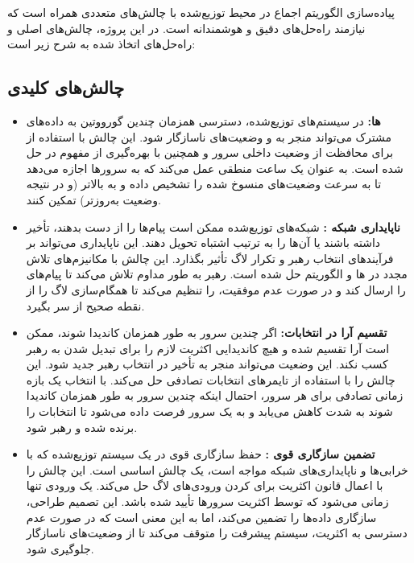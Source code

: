 \documentclass[12pt,a4paper]{article}
\begin{document}
پیاده‌سازی الگوریتم اجماع  در محیط توزیع‌شده با چالش‌های متعددی همراه است که نیازمند راه‌حل‌های دقیق و هوشمندانه است. در این پروژه، چالش‌های اصلی و راه‌حل‌های اتخاذ شده به شرح زیر است:

\subsection{چالش‌های کلیدی}

\begin{itemize}
    \item \textbf{ها:} در سیستم‌های توزیع‌شده، دسترسی همزمان چندین گورووتین به داده‌های مشترک می‌تواند منجر به  و وضعیت‌های ناسازگار شود. این چالش با استفاده از  برای محافظت از وضعیت داخلی سرور  و همچنین با بهره‌گیری از مفهوم  در  حل شده است.  به عنوان یک ساعت منطقی عمل می‌کند که به سرورها اجازه می‌دهد تا به سرعت وضعیت‌های منسوخ شده را تشخیص داده و به  بالاتر (و در نتیجه وضعیت به‌روزتر) تمکین کنند.
    \item \textbf{ناپایداری شبکه :} شبکه‌های توزیع‌شده ممکن است پیام‌ها را از دست بدهند، تأخیر داشته باشند یا آن‌ها را به ترتیب اشتباه تحویل دهند. این ناپایداری می‌تواند بر فرآیندهای انتخاب رهبر و تکرار لاگ تأثیر بگذارد. این چالش با مکانیزم‌های تلاش مجدد  در ها و الگوریتم   حل شده است. رهبر به طور مداوم تلاش می‌کند تا پیام‌های  را ارسال کند و در صورت عدم موفقیت،  را تنظیم می‌کند تا همگام‌سازی لاگ را از نقطه صحیح از سر بگیرد.
    \item \textbf{تقسیم آرا  در انتخابات:} اگر چندین سرور به طور همزمان کاندیدا شوند، ممکن است آرا تقسیم شده و هیچ کاندیدایی اکثریت لازم را برای تبدیل شدن به رهبر کسب نکند. این وضعیت می‌تواند منجر به تأخیر در انتخاب رهبر جدید شود.  این چالش را با استفاده از تایمرهای انتخابات تصادفی  حل می‌کند. با انتخاب یک بازه زمانی تصادفی برای  هر سرور، احتمال اینکه چندین سرور به طور همزمان کاندیدا شوند به شدت کاهش می‌یابد و به یک سرور فرصت داده می‌شود تا انتخابات را برنده شده و رهبر شود.
    \item \textbf{تضمین سازگاری قوی :} حفظ سازگاری قوی در یک سیستم توزیع‌شده که با خرابی‌ها و ناپایداری‌های شبکه مواجه است، یک چالش اساسی است.  این چالش را با اعمال قانون اکثریت  برای  کردن ورودی‌های لاگ حل می‌کند. یک ورودی تنها زمانی  می‌شود که توسط اکثریت سرورها تأیید شده باشد. این تصمیم طراحی، سازگاری داده‌ها را تضمین می‌کند، اما به این معنی است که در صورت عدم دسترسی به اکثریت، سیستم پیشرفت را متوقف می‌کند تا از وضعیت‌های ناسازگار جلوگیری شود.
\end{itemize}
\end{document}
